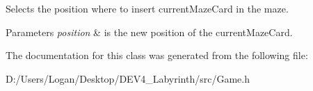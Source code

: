 Selects the position where to insert current\+Maze\+Card in the maze. 


\begin{DoxyParams}{Parameters}
{\em position} & is the new position of the current\+Maze\+Card. \\
\hline
\end{DoxyParams}


The documentation for this class was generated from the following file\+:\begin{DoxyCompactItemize}
\item 
D\+:/\+Users/\+Logan/\+Desktop/\+D\+E\+V4\+\_\+\+Labyrinth/src/Game.\+h\end{DoxyCompactItemize}
